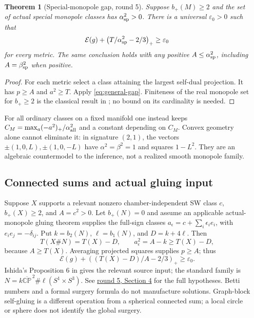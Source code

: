 \documentclass[11pt,a4paper]{article}
\newtheorem{theorem}{Theorem}[section]
\theoremstyle{definition}
\theoremstyle{remark}
\newcommand{\CP}{\mathbb{CP}}
\newcommand{\cE}{\mathcal E}
\newcommand{\roundref}[2]{\href{run:../references/rounds/#1}{#2}}
\numberwithin{equation}{section}
\begin{document}
\begin{theorem}[Special-monopole gap, round 5]\label{thm:special}
Suppose $b_+(M)\ge2$ and the set of actual special monopole classes has
$\alpha_{\rm sp}^2>0$. There is a universal $\varepsilon_0>0$ such that
\begin{equation}\label{eq:special-gap}
 \cE(g)+\left(T/\alpha_{\rm sp}^2-2/3\right)_+\ge\varepsilon_0
\end{equation}
for every metric. The same conclusion holds with any positive
$A\le\alpha_{\rm sp}^2$, including $A=\beta_{\rm sp}^2$ when positive.
\end{theorem}
\begin{proof}
For each metric select a class attaining the largest self-dual projection.
It has $p\ge A$ and $a^2\ge T$. Apply \eqref{eq:general-gap}.
Finiteness of the real monopole set for $b_+\ge2$ is the classical
result in \cite{LeBrunConvex}; no bound on its cardinality is needed.
\end{proof}
For all ordinary classes on a fixed manifold one instead keeps
$C_M=\max_a(-a^2)_+/\alpha_{\rm all}^2$ and a constant depending on
$C_M$. Convex geometry alone cannot eliminate it: in signature $(2,1)$,
the vectors $\pm(1,0,L),\pm(1,0,-L)$ have
$\alpha^2=\beta^2=1$ and squares $1-L^2$. They are an algebraic
countermodel to the inference, not a realized smooth monopole family.

\subsection{Connected sums and actual gluing input}\label{sub:connected-sums}
Suppose $X$ supports a relevant nonzero chamber-independent SW class $c$,
$b_+(X)\ge2$, and $A=c^2>0$. Let $b_+(N)=0$ and assume an applicable
actual-monopole gluing theorem supplies the full-sign classes
$a_\epsilon=c+\sum_i\epsilon_i e_i$, with
$e_i e_j=-\delta_{ij}$. Put $k=b_2(N)$, $\ell=b_1(N)$, and
$D=k+4\ell$. Then
\[
 T(X\#N)=T(X)-D,\qquad
 a_\epsilon^2=A-k\ge T(X)-D,
\]
because $A\ge T(X)$. Averaging projected squares supplies $p\ge A$;
thus
\begin{equation}\label{eq:surgery-gap}
 \cE(g)+\left((T(X)-D)/A-2/3\right)_+\ge\varepsilon_0.
\end{equation}
Ishida's Proposition 6 in \cite{Ishida} gives the relevant source input;
the standard family is
$N=k\overline{\CP}^{\,2}\#\ell(S^1\times S^3)$.
See \roundref{round5_rigidity.md}{round 5, Section 4} for the full
hypotheses. Betti numbers and a formal surgery formula do not manufacture
solutions. Graph-block self-gluing is a different operation from a
spherical connected sum; a local circle or sphere does not identify the
global surgery.
\end{document}
